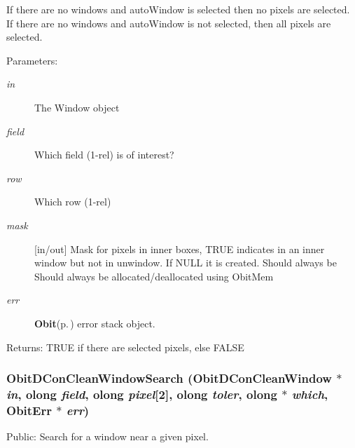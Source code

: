 If there are no windows and auto\-Window is selected then no pixels are selected. If there are no windows and auto\-Window is not selected, then all pixels are selected. \begin{Desc}
\item[Parameters:]
\begin{description}
\item[{\em in}]The Window object \item[{\em field}]Which field (1-rel) is of interest? \item[{\em row}]Which row (1-rel) \item[{\em mask}][in/out] Mask for pixels in inner boxes, TRUE indicates in an inner window but not in unwindow. If NULL it is created. Should always be Should always be allocated/deallocated using Obit\-Mem \item[{\em err}]{\bf Obit}{\rm (p.\,\pageref{structObit})} error stack object. \end{description}
\end{Desc}
\begin{Desc}
\item[Returns:]TRUE if there are selected pixels, else FALSE \end{Desc}
\subsubsection{ Obit\-DCon\-Clean\-Window\-Search ({\bf Obit\-DCon\-Clean\-Window} $\ast$ {\em in}, {\bf olong} {\em field}, {\bf olong} {\em pixel}[2], {\bf olong} {\em toler}, {\bf olong} $\ast$ {\em which}, {\bf Obit\-Err} $\ast$ {\em err})}\label{ObitDConCleanWindow_8c_a18}


Public: Search for a window near a given pixel. 

